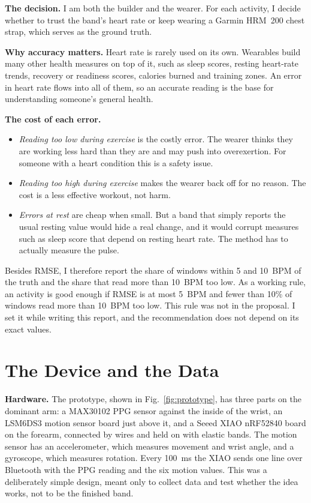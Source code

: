\documentclass[conference]{IEEEtran}
\begin{document}
\textbf{The decision.} I am both the builder and the wearer. For each activity, I decide whether to trust the band's heart rate or keep wearing a Garmin HRM~200 chest strap, which serves as the ground truth.

\textbf{Why accuracy matters.} Heart rate is rarely used on its own. Wearables build many other health measures on top of it, such as sleep scores, resting heart-rate trends, recovery or readiness scores, calories burned and training zones. An error in heart rate flows into all of them, so an accurate reading is the base for understanding someone's general health.

\textbf{The cost of each error.}
\begin{itemize}
\item \emph{Reading too low during exercise} is the costly error. The wearer thinks they are working less hard than they are and may push into overexertion. For someone with a heart condition this is a safety issue.
\item \emph{Reading too high during exercise} makes the wearer back off for no reason. The cost is a less effective workout, not harm.
\item \emph{Errors at rest} are cheap when small. But a band that simply reports the usual resting value would hide a real change, and it would corrupt measures such as sleep score that depend on resting heart rate. The method has to actually measure the pulse.
\end{itemize}
Besides RMSE, I therefore report the share of windows within 5 and 10~BPM of the truth and the share that read more than 10~BPM too low. As a working rule, an activity is good enough if RMSE is at most 5~BPM and fewer than 10\% of windows read more than 10~BPM too low. This rule was not in the proposal. I set it while writing this report, and the recommendation does not depend on its exact values.

\section{The Device and the Data}
\textbf{Hardware.} The prototype, shown in Fig.~\ref{fig:prototype}, has three parts on the dominant arm: a MAX30102 PPG sensor against the inside of the wrist, an LSM6DS3 motion sensor board just above it, and a Seeed XIAO nRF52840 board on the forearm, connected by wires and held on with elastic bands. The motion sensor has an accelerometer, which measures movement and wrist angle, and a gyroscope, which measures rotation. Every 100~ms the XIAO sends one line over Bluetooth with the PPG reading and the six motion values. This was a deliberately simple design, meant only to collect data and test whether the idea works, not to be the finished band.
\end{document}
